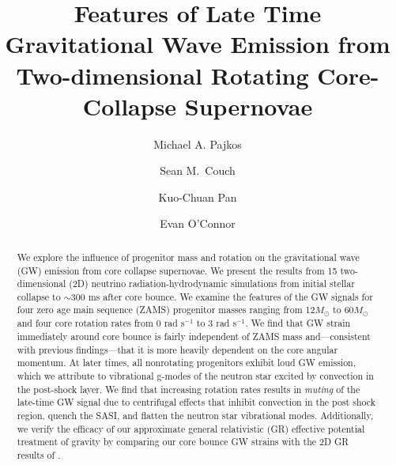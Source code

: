 \documentclass[twocolumn,times]{aastex62}  %
\begin{document}
 


\title{Features of Late Time Gravitational Wave Emission from Two-dimensional Rotating Core-Collapse Supernovae}

\author{Michael A. Pajkos}

\author[0000-0002-5080-5996]{Sean M.~Couch}

\author{Kuo-Chuan Pan}

\author{Evan O'Connor}

\received{\today}

 \begin{abstract}
  We explore the influence of progenitor mass and rotation on the gravitational wave (GW) emission from core collapse supernovae.  We present the results from 15 two-dimensional (2D) neutrino radiation-hydrodynamic simulations from initial stellar collapse to $\sim$300 ms after core bounce.  We examine the features of the GW signals for four zero age main sequence (ZAMS) progenitor masses ranging from 12\(M_\odot\) to 60\(M_\odot\) and four core rotation rates from 0 rad s$^{-1}$ to 3 rad s$^{-1}$. We find that GW strain immediately around core bounce is fairly independent of ZAMS mass and---consistent with previous findings---that it is more heavily dependent on the core angular momentum.  At later times, all nonrotating progenitors exhibit loud GW emission, which we attribute to vibrational g-modes of the neutron star excited by convection in the post-shock layer.  We find that increasing rotation rates results in {\it muting} of the late-time GW signal due to centrifugal effects that inhibit convection in the post shock region, quench the SASI, and flatten the neutron star vibrational modes.  Additionally, we verify the efficacy of our approximate general relativistic (GR) effective potential treatment of gravity by comparing our core bounce GW strains with the 2D GR results of \citet{richers:2017}. 
\end{abstract}
\end{document}
